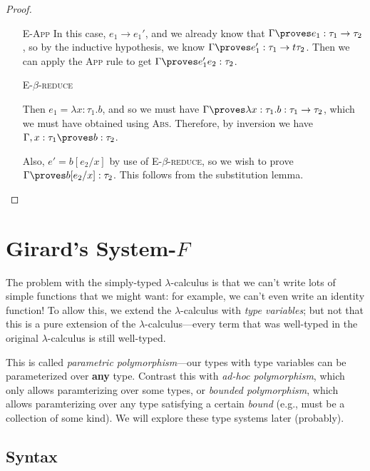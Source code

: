 \documentclass[10pt]{article}
\begin{document}
\begin{proof}
    \begin{itemize}
        \item[\textsc{E-App}] In this case, $e_1 \to e_1'$, and we already know that $\Gamma \proves e_1 : \tau_1 \to \tau_2$, so by the inductive hypothesis, we know $\Gamma \proves e_1' : \tau_1 \to t\tau_2$.
            Then we can apply the \textsc{App} rule to get $\Gamma \proves e_1' e_2 : \tau_2$.

        \item[\textsc{E-$\beta$-reduce}]

            Then $e_1 = \lambda x : \tau_1. b$, and so we must have $\Gamma \proves \lambda x : \tau_1 . b : \tau_1 \to \tau_2$, which we must have obtained using \textsc{Abs}.
            Therefore, by inversion we have $\Gamma, x : \tau_1 \proves b : \tau_2$.

            Also, $e' = b[e_2/x]$ by use of \textsc{E-$\beta$-reduce}, so we wish to prove $\Gamma \proves b[e_2/x] : \tau_2$.
            This follows from the substitution lemma.
    \end{itemize}

\end{proof}

\section{Girard's System-$F$}

The problem with the simply-typed $\lambda$-calculus is that we can't write lots of simple functions that we might want: for example, we can't even write an identity function!
To allow this, we extend the $\lambda$-calculus with \emph{type variables}; but not that this is a pure extension of the $\lambda$-calculus---every term that was well-typed in the original $\lambda$-calculus is still well-typed.

This is called \emph{parametric polymorphism}---our types with type variables can be parameterized over \textbf{any} type.
Contrast this with \emph{ad-hoc polymorphism}, which only allows paramterizing over some types, or \emph{bounded polymorphism}, which allows paramterizing over any type satisfying a certain \emph{bound} (e.g., must be a collection of some kind).
We will explore these type systems later (probably).

\subsection{Syntax}
\end{document}
